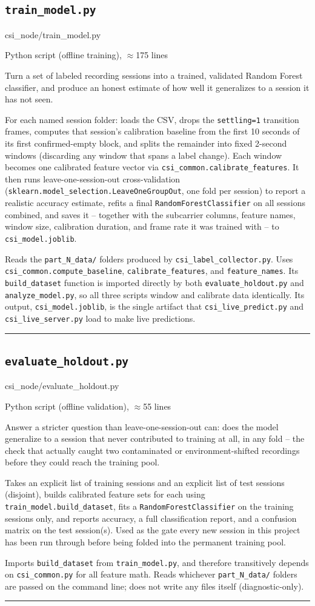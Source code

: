 \documentclass[11pt,a4paper]{article}
\newcommand{\filepath}[1]{{\small\ttfamily\color{pathgray}#1}}
\newcommand{\fileentry}[6]{%
    \subsection{\texttt{#1}}
    \filepath{#2}
    \vspace{0.15cm}
    \begin{description}[leftmargin=2.6cm, style=nextline]
        \item[Type] #3
        \item[Objective] #4
        \item[Role] #5
        \item[Connections] #6
    \end{description}
    \vspace{0.2cm}
    \hrule
    \vspace{0.3cm}
}
\begin{document}
\fileentry
{train\_model.py}
{csi\_node/train\_model.py}
{Python script (offline training), \(\approx\)175 lines}
{Turn a set of labeled recording sessions into a trained, validated
    Random Forest classifier, and produce an honest estimate of how well
    it generalizes to a session it has not seen.}
{For each named session folder: loads the CSV, drops the
    \texttt{settling=1} transition frames, computes that session's
    calibration baseline from the first 10 seconds of its first
    confirmed-empty block, and splits the remainder into fixed
    2-second windows (discarding any window that spans a label change).
    Each window becomes one calibrated feature vector via
    \texttt{csi\_common.calibrate\_features}. It then runs
    leave-one-session-out cross-validation
    (\texttt{sklearn.model\_selection.LeaveOneGroupOut}, one fold per
    session) to report a realistic accuracy estimate, refits a final
    \texttt{RandomForestClassifier} on all sessions combined, and saves
    it -- together with the subcarrier columns, feature names, window
    size, calibration duration, and frame rate it was trained with -- to
    \texttt{csi\_model.joblib}.}
{Reads the \texttt{part\_N\_data/} folders produced by
    \texttt{csi\_label\_collector.py}. Uses
    \texttt{csi\_common.compute\_baseline}, \texttt{calibrate\_features},
    and \texttt{feature\_names}. Its \texttt{build\_dataset} function is
    imported directly by both \texttt{evaluate\_holdout.py} and
    \texttt{analyze\_model.py}, so all three scripts window and
    calibrate data identically. Its output,
    \texttt{csi\_model.joblib}, is the single artifact that
    \texttt{csi\_live\_predict.py} and \texttt{csi\_live\_server.py}
    load to make live predictions.}

\fileentry
{evaluate\_holdout.py}
{csi\_node/evaluate\_holdout.py}
{Python script (offline validation), \(\approx\)55 lines}
{Answer a stricter question than leave-one-session-out can: does the
    model generalize to a session that never contributed to training at
    all, in any fold -- the check that actually caught two contaminated
    or environment-shifted recordings before they could reach the
    training pool.}
{Takes an explicit list of training sessions and an explicit list of
    test sessions (disjoint), builds calibrated feature sets for each
    using \texttt{train\_model.build\_dataset}, fits a
    \texttt{RandomForestClassifier} on the training sessions only, and
    reports accuracy, a full classification report, and a confusion
    matrix on the test session(s). Used as the gate every new session in
    this project has been run through before being folded into the
    permanent training pool.}
{Imports \texttt{build\_dataset} from \texttt{train\_model.py}, and
    therefore transitively depends on \texttt{csi\_common.py} for all
    feature math. Reads whichever \texttt{part\_N\_data/} folders are
    passed on the command line; does not write any files itself
    (diagnostic-only).}
\end{document}

